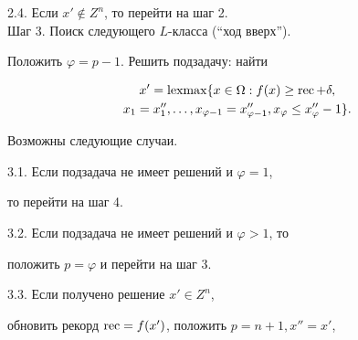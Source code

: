 \hspace{10mm} 2.4. Если $x' \not \in Z^{n}$, то перейти на шаг 2.\\





\noindent{}Шаг 3. Поиск следующего $L$-класса (``ход вверх'').





\hspace{10mm} Положить $\varphi = p-1$. Решить подзадачу: найти





\begin{gather*}


x'= \lexmax \{x \in \Omega :  f(x) \geq \rec + \delta, \\


x_1=x''_1, \dotsc ,x_{\varphi-1} =x''_{\varphi-1},  x_\varphi \leq


x''_\varphi  - 1\}.


\end{gather*}





\hspace{10mm} Возможны следующие случаи.





\hspace{10mm} 3.1. Если подзадача не имеет решений и $\varphi=1$,


то перейти на шаг 4.





\hspace{10mm} 3.2. Если подзадача не имеет решений и $\varphi>1$, то





\hspace{17mm} положить $p = \varphi$ и перейти на шаг 3.





\hspace{10mm} 3.3. Если получено решение $x' \in  Z^n$,





\hspace{17mm} обновить рекорд $\operatorname{rec} = f(x')$, положить $p = n+1,x''= x'$,






